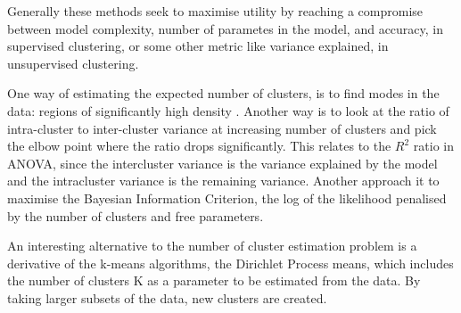

Generally these methods seek to maximise utility by reaching a compromise between model complexity, number of parametes in the model,
and accuracy, in supervised clustering, or some other metric like variance explained, in unsupervised clustering.

One way of estimating the expected number of clusters, is to find modes in the data: regions of significantly high density \citep{Duong:2008eu,JING:2012ek}.
Another way is to look at the ratio of intra-cluster to inter-cluster variance at increasing number of clusters and pick the elbow point where the ratio drops significantly.
This relates to the $R^2$ ratio in \gls{ANOVA}, since the intercluster variance is the variance explained by the model and the intracluster variance is the remaining variance.
Another approach it to maximise the Bayesian Information Criterion, the log of the likelihood penalised by the number of clusters and free parameters.


An interesting alternative to the number of cluster estimation problem is a derivative of the k-means algorithms,
the Dirichlet Process means, which includes the number of clusters
K as a parameter to be estimated from the data.
By taking larger subsets of the data, new clusters are created.

